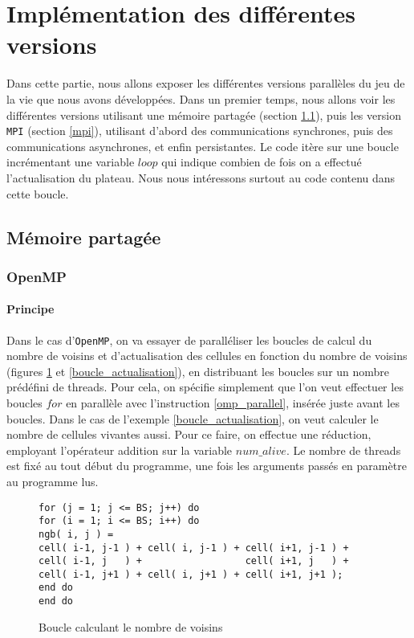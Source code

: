 \section{Implémentation des différentes versions} %
\label{sec:diff_rents_versions}
Dans cette partie, nous allons exposer les différentes versions parallèles du jeu de la vie que nous avons développées. Dans un premier temps, nous allons voir les différentes versions utilisant une mémoire partagée (section \ref{partagee}), puis les version \texttt{MPI} (section \ref{mpi}), utilisant d'abord des communications synchrones, puis des communications asynchrones, et enfin persistantes. Le code itère sur une boucle incrémentant une variable $loop$ qui indique combien de fois on a effectué l'actualisation du plateau. Nous nous intéressons surtout au code contenu dans cette boucle.

\subsection{Mémoire partagée}
\label{partagee}

\subsubsection{OpenMP}
\label{openmp}
\paragraph{Principe}
Dans le cas d'\texttt{OpenMP}, on va essayer de paralléliser les boucles de calcul du nombre de voisins et d'actualisation des cellules en fonction du nombre de voisins (figures \ref{boucle_voisins} et \ref{boucle_actualisation}), en distribuant les boucles sur un nombre prédéfini de threads. Pour cela, on spécifie simplement que l'on veut effectuer les boucles $for$ en parallèle avec l'instruction \ref{omp_parallel}, insérée juste avant les boucles. Dans le cas de l'exemple \ref{boucle_actualisation}, on veut calculer le nombre de cellules vivantes aussi. Pour ce faire, on effectue une réduction, employant l'opérateur addition sur la variable $num\_alive$. Le nombre de threads est fixé au tout début du programme, une fois les arguments passés en paramètre au programme lus. 

\begin{figure}[!ht]
\begin{lstlisting}
for (j = 1; j <= BS; j++) do
for (i = 1; i <= BS; i++) do
ngb( i, j ) =
cell( i-1, j-1 ) + cell( i, j-1 ) + cell( i+1, j-1 ) +
cell( i-1, j   ) +                  cell( i+1, j   ) +
cell( i-1, j+1 ) + cell( i, j+1 ) + cell( i+1, j+1 );
end do
end do
\end{lstlisting}
\caption{Boucle calculant le nombre de voisins}
\label{boucle_voisins}
\end{figure}


